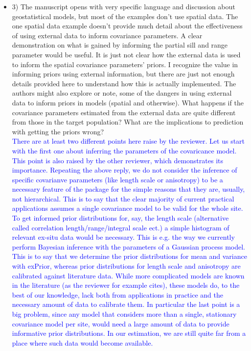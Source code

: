 \documentclass{article}
\begin{document}
\begin{itemize}
    \item 3) The manuscript opens with very specific language and discussion about geostatistical models, but most of the examples don't use spatial data. The one spatial data example doesn't provide much detail about the effectiveness of using external data to inform covariance parameters. A clear demonstration on what is gained by informing the partial sill and range parameter would be useful. It is just not clear how the external data is used to inform the spatial covariance parameters' priors. I recognize the value in informing priors using external information, but there are just not enough details provided here to understand how this is actually implemented. The authors might also explore or note, some of the dangers in using external data to inform priors in models (spatial and otherwise). What happens if the covariance parameters estimated from the external data are quite different from those in the target population? What are the implications to prediction with getting the priors wrong?\\
    \textcolor{blue}{There are at least two different points here raise by the reviewer. Let us start with the first one about inferring the parameters of the covaricance model. This point is also raised by the other reviewer, which demonstrates its importance. Repeating the above reply, we do not consider the inference of specific covarianve parameters (like length scale or anisotropy) to be a necessary feature of the package for the simple reasons that they are, usually, not hierarchical. This is to say that the clear majority of current practical applications assumes a single covariance model to be valid for the whole site. To get informed prior distributions for, say, the length scale (alternative called correlation length/range/integral scale ect.) a simple histogram of relevant ex-situ data would be necessary. This is e.g. the way we currently perform Bayesian inference with the parameters of a Gaussian process model. This is to say that we determine the prior distributions for mean and variance with exPrior, whereas prior distributions for length scale and anisotropy are calibrated against literature data. While more complicated models are known in the literature (as the reviewer for example cites), these models do, to the best of our knowledge, lack both from applications in practice and the necessary amount of data to calibrate them. In particular the last point is a big problem, since any model that considers more than a single, stationary covariance model per site, would need a large amount of data to provide informative prior distributions. In our estimation, we are still quite far from a place where such data would become available. 
}
\end{itemize}
\end{document}

